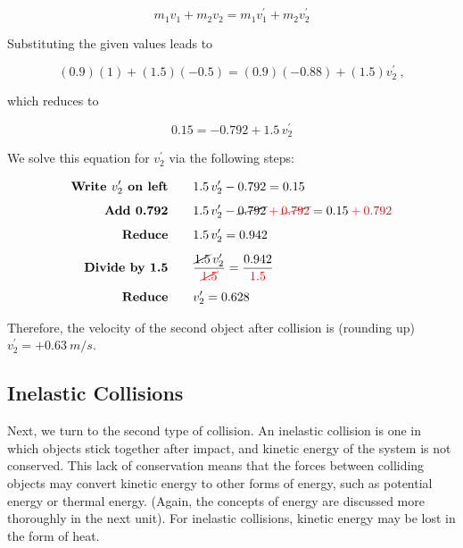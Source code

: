 \documentclass[main.tex]{subfiles}
\begin{document}
\begin{equation*} 
    m_1 v_1 + m_2 v_2 = m_1 v_1^{\prime} + m_2 v_2^{\prime}
\end{equation*}

Substituting the given values leads to

\begin{equation*}
    (0.9)(1) + (1.5)(-0.5) = (0.9)(-0.88) + (1.5) v_2^{\prime}\ ,
\end{equation*}

which reduces to

\begin{equation*}
    0.15 = -0.792 + 1.5\,v_2^{\prime}
\end{equation*}

We solve this equation for $v_2^{\prime}$ via the following steps:
\vspace{-1em}

\begin{align*}
    \textbf{Write $v_2^{\prime}$ on left} \qquad & 1.5\,v_2^{\prime} - 0.792 = 0.15\\[1ex]
    \textbf{Add 0.792} \qquad & 1.5\,v_2^{\prime} - \cancel{0.792} \mathbin{\color{red} +} \textcolor{red}{\cancel{0.792}} = 0.15 \mathbin{\color{red} +} \textcolor{red}{0.792}\\[1ex]
    \textbf{Reduce} \qquad & 1.5\,v_2^{\prime} = 0.942\\[1ex]
    \textbf{Divide by 1.5} \qquad & \frac{\cancel{1.5}\,v_2^{\prime}}{\textcolor{red}{\cancel{1.5}}} = \frac{0.942}{\textcolor{red}{1.5}}\\[1ex]
    \textbf{Reduce} \qquad & v_2^{\prime} = 0.628
\end{align*}

Therefore, the velocity of the second object after collision is (rounding up) $v_2^{\prime} = +\SI{0.63}{m/s}$.

\endsolution

\cyanhrule

\subsection{Inelastic Collisions} \label{v90mza}

Next, we turn to the second type of collision. An \gls{inelastic collision} is one in which objects stick together after impact, and kinetic energy of the system is not conserved. This lack of conservation means that the forces between colliding objects may convert kinetic energy to other forms of energy, such as potential energy or thermal energy. (Again, the concepts of energy are discussed more thoroughly in the next unit). For inelastic collisions, kinetic energy may be lost in the form of heat. 
\vspace{1em}
\end{document}
